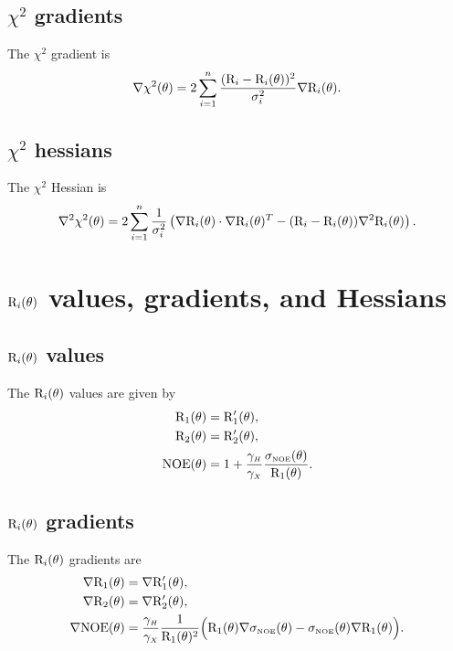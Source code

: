 \subsection{$\chi^2$ gradients}

The $\chi^2$ gradient is
\begin{equation}
 \nabla \chi^2(\theta) = 2 \sum_{i=1}^n \frac{(\mathrm{R}_i - \mathrm{R}_i(\theta))^2}{\sigma_i^2} \nabla \mathrm{R}_i(\theta).
\end{equation}


\subsection{$\chi^2$ hessians}

The $\chi^2$ Hessian is
\begin{equation}
 \nabla^2 \chi^2(\theta) = 2 \sum_{i=1}^n \frac{1}{\sigma_i^2} \left(\nabla \mathrm{R}_i(\theta) \cdot \nabla \mathrm{R}_i(\theta)^T - (\mathrm{R}_i - \mathrm{R}_i(\theta)) \nabla^2 \mathrm{R}_i(\theta) \right).
\end{equation}




\section{$\mathrm{R}_i(\theta)$ values, gradients, and Hessians}


\subsection{$\mathrm{R}_i(\theta)$ values}

The $\mathrm{R}_i(\theta)$ values are given by
\begin{align}
    \mathrm{R}_1(\theta) & = \mathrm{R}_1'(\theta), \label{eq: Ri trans: R1} \\
    \mathrm{R}_2(\theta) & = \mathrm{R}_2'(\theta), \label{eq: Ri trans: R2} \\
    \mathrm{NOE}(\theta) & = 1 + \frac{\gamma_{\scriptscriptstyle H}}{\gamma_{\scriptscriptstyle X}} \frac{\sigma_{\scriptscriptstyle \mathrm{NOE}}(\theta)}{\mathrm{R}_1(\theta)}. \label{eq: Ri trans: NOE}
\end{align}


\subsection{$\mathrm{R}_i(\theta)$ gradients}

The $\mathrm{R}_i(\theta)$ gradients are
\begin{align}
    \nabla \mathrm{R}_1(\theta) & = \nabla \mathrm{R}_1'(\theta), \label{eq: Ri trans: dR1} \\
    \nabla \mathrm{R}_2(\theta) & = \nabla \mathrm{R}_2'(\theta), \label{eq: Ri trans: dR2} \\
    \nabla \mathrm{NOE}(\theta) & = \frac{\gamma_{\scriptscriptstyle H}}{\gamma_{\scriptscriptstyle X}} \frac{1}{\mathrm{R}_1(\theta)^2} \Big(
        \mathrm{R}_1(\theta) \nabla \sigma_{\scriptscriptstyle \mathrm{NOE}}(\theta) - \sigma_{\scriptscriptstyle \mathrm{NOE}}(\theta) \nabla \mathrm{R}_1(\theta)
    \Big). \label{eq: Ri trans: dNOE}
\end{align}


